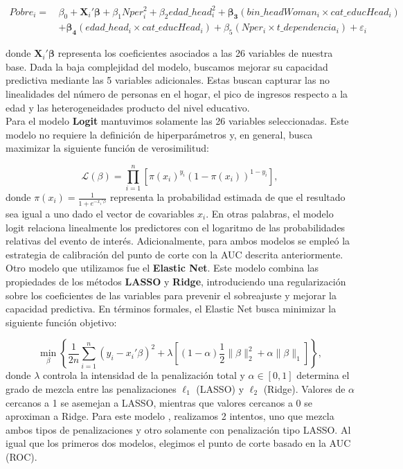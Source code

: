 \documentclass[12pt,a4paper,onecolumn]{article}
\begin{document}
\begin{equation}
\begin{aligned}
Pobre_i = \, & \beta_0 
+ \mathbf{X}_i'\boldsymbol{\beta} 
+ \beta_1 Nper_i^2 
+ \beta_2 edad\_head_i^2 
+ \boldsymbol{\beta_3} (bin\_headWoman_i \times cat\_educHead_i) \\
& + \boldsymbol{\beta_4} (edad\_head_i \times cat\_educHead_i)
+ \beta_5 (Nper_i \times t\_dependencia_i)
+ \varepsilon_i
\end{aligned}
\label{eq:modelo_mpl}
\end{equation}

donde $\mathbf{X}_i'\boldsymbol{\beta} $ representa los coeficientes asociados a las 26 variables de nuestra base. Dada la baja complejidad del modelo, buscamos mejorar su capacidad predictiva mediante las 5 variables adicionales. Estas buscan capturar las no linealidades del número de personas en el hogar, el pico de ingresos respecto a la edad y las heterogeneidades producto del nivel educativo.\\

Para el modelo \textbf{Logit} mantuvimos solamente las 26 variables seleccionadas. Este modelo no requiere la definición de hiperparámetros y, en general, busca maximizar la siguiente función de verosimilitud:

\[
\mathcal{L}(\beta) = \prod_{i=1}^{n} \left[ \pi(x_i)^{y_i} \left(1 - \pi(x_i)\right)^{1 - y_i} \right],
\]
donde \(\pi(x_i) = \frac{1}{1 + e^{-x_i'\beta}}\) representa la probabilidad estimada de que el resultado sea igual a uno dado el vector de covariables \(x_i\). En otras palabras, el modelo logit relaciona linealmente los predictores con el logaritmo de las probabilidades relativas del evento de interés. Adicionalmente, para ambos modelos se empleó la estrategia de calibración del punto de corte con la AUC descrita anteriormente.\\

Otro modelo que utilizamos fue el \textbf{Elastic Net}. Este modelo combina las propiedades de los métodos \textbf{LASSO} y \textbf{Ridge}, introduciendo una regularización sobre los coeficientes de las variables para prevenir el sobreajuste y mejorar la capacidad predictiva. En términos formales, el Elastic Net busca minimizar la siguiente función objetivo:

\[
\min_{\beta} \left\{ 
\frac{1}{2n} \sum_{i=1}^{n} (y_i - x_i'\beta)^2 
+ \lambda \left[ (1 - \alpha)\frac{1}{2} \|\beta\|_2^2 + \alpha \|\beta\|_1 \right]
\right\},
\]
donde \(\lambda\) controla la intensidad de la penalización total y \(\alpha \in [0,1]\) determina el grado de mezcla entre las penalizaciones \(\ell_1\) (LASSO) y \(\ell_2\) (Ridge). Valores de \(\alpha\) cercanos a 1 se asemejan a LASSO, mientras que valores cercanos a 0 se aproximan a Ridge. Para este modelo , realizamos 2 intentos, uno que mezcla ambos tipos de penalizaciones y otro solamente con penalización tipo LASSO. Al igual que los primeros dos modelos, elegimos el punto de corte basado en la AUC (ROC). \\
\end{document}
